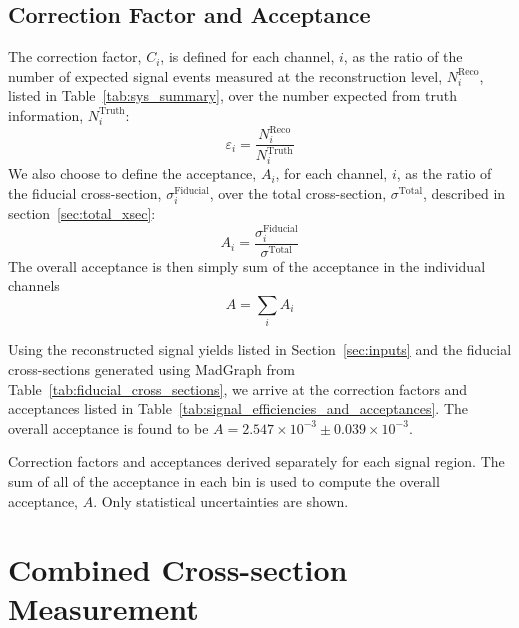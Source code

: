 \subsection{Correction Factor and Acceptance}
\label{sec:signal_efficiency_and_acceptance}

The correction factor, $C_i$, is defined for each channel, $i$,
as the ratio of the number of expected signal events measured
at the reconstruction level, $N_i^{\textrm{Reco}}$, listed
in Table~\ref{tab:sys_summary},
over the number expected from truth information, $N_i^{\textrm{Truth}}$:
\begin{equation}
\varepsilon_i = \frac{N_i^{\textrm{Reco}}}{N_i^{\textrm{Truth}}}
\end{equation}
We also choose to define the acceptance, $A_i$, for each channel, $i$,
as the ratio of the fiducial cross-section, $\sigma^{\textrm{Fiducial}}_i$,
over the total cross-section, $\sigma^{\textrm{Total}}$, 
described in section~\ref{sec:total_xsec}:
\begin{equation}
A_i = \frac{ \sigma^{\textrm{Fiducial}}_i }{ \sigma^{\textrm{Total}}}
\end{equation}
The overall acceptance is then simply sum of the acceptance in the individual channels
\begin{equation}
A = \sum_i A_i
\end{equation}

Using the reconstructed signal yields listed in Section~\ref{sec:inputs} and the fiducial
cross-sections generated using MadGraph
from Table~\ref{tab:fiducial_cross_sections}, we
arrive at the correction factors and acceptances listed in Table~\ref{tab:signal_efficiencies_and_acceptances}.
The overall acceptance is found to be $A = 2.547 \times 10^{-3} \pm 0.039 \times 10^{-3}$.


\begin{table}[ht!]
\centering

\caption{Correction factors and acceptances derived separately for each signal region. The sum of all of the acceptance
in each bin is used to compute the overall acceptance, $A$. Only statistical uncertainties are shown.}
\label{tab:signal_efficiencies_and_acceptances}
\end{table}


\section{Combined Cross-section Measurement}

